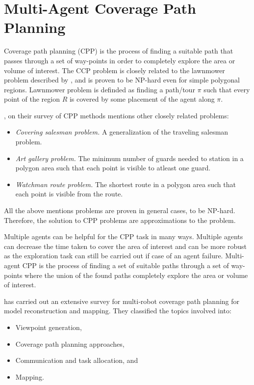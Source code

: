 \section{Multi-Agent Coverage Path Planning}

Coverage path planning (CPP) is the process of finding a suitable path that passes through a set of way-points in order to completely explore the area or volume of interest. The CCP problem is closely related to the lawnmower problem described by , and is proven to be NP-hard even for simple polygonal regions. Lawnmower problem is definded as finding a path/tour $\pi$ such that every point of the region $R$ is covered by some placement of the agent along $\pi$.

, on their survey of CPP methods mentions other closely related problems:

\begin{itemize}
	\item \textit{Covering salesman problem.} A generalization of the traveling salesman problem.
	\item \textit{Art gallery problem.} The minimum number of guards needed to station in a polygon area such that each point is visible to atleast one guard.
	\item \textit{Watchman route problem.} The shortest route in a polygon area such that each point is visible from the route.
\end{itemize}

All the above mentions problems are proven in general cases, to be NP-hard. Therefore, the solution to CPP problems are approximations to the problem.

Multiple agents can be helpful for the CPP task in many ways. Multiple agents can decrease the time taken to cover the area of interest and can be more robust as the exploration task can still be carried out if case of an agent failure. Multi-agent CPP is the process of finding a set of suitable paths through a set of way-points where the union of the found paths completely explore the area or volume of interest. 

 has carried out an extensive survey for multi‑robot coverage path planning for model reconstruction and mapping. They classified the topics involved into:
\begin{itemize}
	\item Viewpoint generation,
	\item Coverage path planning approaches,
	\item Communication and task allocation, and
	\item Mapping.
\end{itemize}

